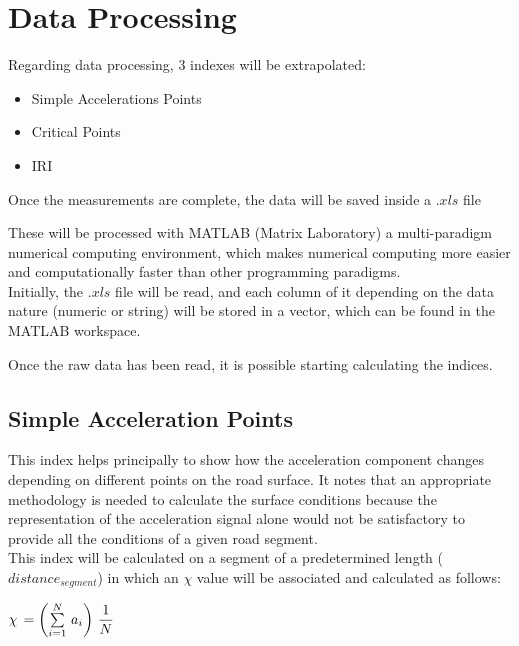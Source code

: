 \documentclass[tesi]{subfiles}
\begin{document}
 
 
 \section{Data Processing}\label{sc:Data Processing}
 Regarding data processing, 3 indexes will be extrapolated:
 
 \begin{itemize}
 \item Simple Accelerations Points
 \item Critical Points
 \item IRI
 \end{itemize}


\noindent Once the measurements are complete, the data will be saved inside a $.xls$ file

\noindent These will be processed with MATLAB (Matrix Laboratory) a multi-paradigm numerical computing environment, which makes numerical computing more easier and computationally faster than other programming paradigms.\\

\noindent Initially, the $.xls$ file will be read, and each column of it depending on the data nature (numeric or string) will be stored in a vector, which can be found in the MATLAB workspace.

\noindent Once the raw data has been read, it is possible starting calculating the indices.


\subsection{Simple Acceleration Points}\label{ssc:Simple Accelerations Points}
This index helps principally to show how the acceleration component changes depending on different points on the road surface. It notes that an appropriate methodology is needed to calculate the surface conditions because the representation of the acceleration signal alone would not be satisfactory to provide all the conditions of a given road segment.\\
This index will be calculated on a segment of a predetermined length ($distance_{segment}$) in which an $\chi$ value will be associated and calculated as follows:

\begin{center}
 $\chi \thinspace = \left( \sum \limits_{i=1}^{N} \thinspace a_{i} \right) \thinspace \dfrac{1}{N}$
\end{center}\label{eq:sap}
\end{document}
